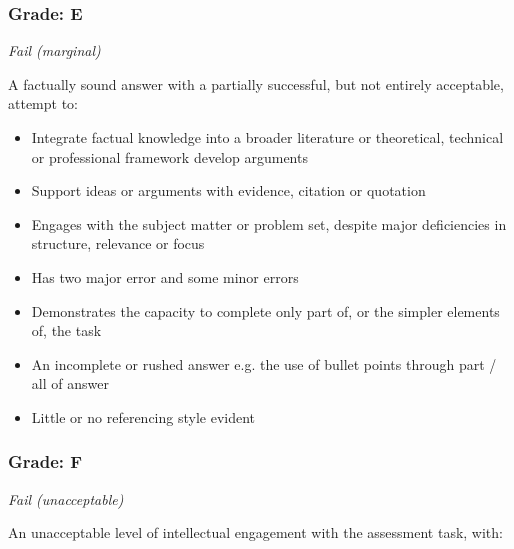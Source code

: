 \subsubsection*{Grade: E}

\textit{Fail (marginal)}

A factually sound answer with a partially successful, but not entirely acceptable, attempt to:

\begin{itemize}
	\item Integrate factual knowledge into a broader literature or theoretical, technical or professional framework develop arguments
	\item Support ideas or arguments with evidence, citation or quotation
	\item Engages with the subject matter or
	problem set, despite major
	deficiencies in structure, relevance or focus
	\item Has two major error and some minor
	errors
	\item Demonstrates the capacity to
	complete only part of, or the simpler
	elements of, the task
	\item An incomplete or rushed answer e.g.
	the use of bullet points through part /
	all of answer
	\item Little or no referencing style evident
\end{itemize}

\subsubsection*{Grade: F}

\textit{Fail (unacceptable)}

An unacceptable level of intellectual engagement with
the assessment task, with:

